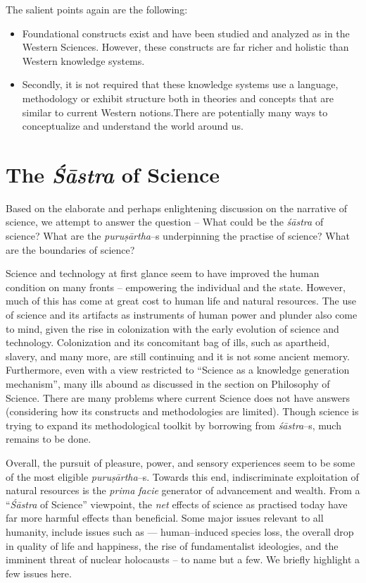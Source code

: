 The salient points again are the following:

\begin{itemize}
\item Foundational constructs exist and have been studied and analyzed as in the Western Sciences. However, these constructs are far richer and holistic than Western knowledge systems.

 \item Secondly, it is not required that these knowledge systems use a language, methodology or exhibit structure both in theories and concepts that are similar to current Western notions.There are potentially many ways to conceptualize and understand the world around us.

\end{itemize}


\section*{The \textit{Śāstra} of Science}

Based on the elaborate and perhaps enlightening discussion on the narrative of science, we attempt to answer the question – What could be the \textit{śāstra} of science? What are the \textit{puruṣārtha}–s underpinning the practise of science? What are the boundaries of science?

Science and technology at first glance seem to have improved the human condition on many fronts – empowering the individual and the state. However, much of this has come at great cost to human life and natural resources. The use of science and its artifacts as instruments of human power and plunder also come to mind, given the rise in colonization with the early evolution of science and technology. Colonization and its concomitant bag of ills, such as apartheid, slavery, and many more, are still continuing and it is not some ancient memory. Furthermore, even with a view restricted to “Science as a knowledge generation mechanism”, many ills abound as discussed in the section on Philosophy of Science. There are many problems where current Science does not have answers (considering how its constructs and methodologies are limited). Though science is trying to expand its methodological toolkit by borrowing from \textit{śāstra}–s, much remains to be done.

Overall, the pursuit of pleasure, power, and sensory experiences seem to be some of the most eligible \textit{puruṣārtha}–s. Towards this end, indiscriminate exploitation of natural resources is the \textit{prima facie} generator of advancement and wealth. From a “\textit{Śāstra} of Science” viewpoint, the \textit{net} effects of science as practised today have far more harmful effects than beneficial. Some major issues relevant to all humanity, include issues such as — human–induced species loss, the overall drop in quality of life and happiness, the rise of fundamentalist ideologies, and the imminent threat of nuclear holocausts – to name but a few. We briefly highlight a few issues here.

